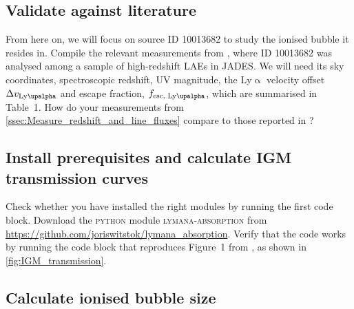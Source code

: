 \documentclass{article}
\newcommand{\Lya}{{Ly\ensuremath{\upalpha}}\xspace}
\theoremstyle{definition}
\begin{document}
\subsection{Validate against literature}

From here on, we will focus on source ID 10013682 to study the ionised bubble it resides in. Compile the relevant measurements from \citet{2024A&A...682A..40W}, where ID 10013682 was analysed among a sample of high-redshift LAEs in JADES. We will need its sky coordinates, spectroscopic redshift, UV magnitude, the \Lya velocity offset $\Delta v_\text{\Lya}$ and escape fraction, $f_\text{esc, \Lya}$, which are summarised in Table~1. How do your measurements from \cref{ssec:Measure_redshift_and_line_fluxes} compare to those reported in \citet{2024A&A...682A..40W}?

\subsection{Install prerequisites and calculate IGM transmission curves}

Check whether you have installed the right modules by running the first code block. Download the \textsc{python} module \textsc{lymana-absorption} from \url{https://github.com/joriswitstok/lymana_absorption}. Verify that the code works by
running the code block that reproduces Figure~1 from \citet{2020MNRAS.499.1395M}, as shown in \cref{fig:IGM_transmission}.

\subsection{Calculate ionised bubble size}
\label{Calculate_ionised_bubble_size}
\end{document}
